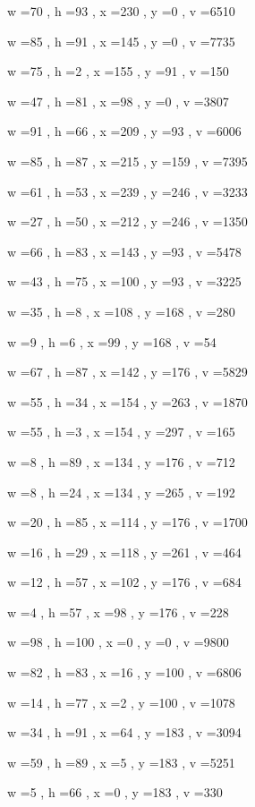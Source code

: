\documentclass[11pt]{article}
\begin{document}
w =70 , h =93 , x =230 , y =0 , v =6510
\par
w =85 , h =91 , x =145 , y =0 , v =7735
\par
w =75 , h =2 , x =155 , y =91 , v =150
\par
w =47 , h =81 , x =98 , y =0 , v =3807
\par
w =91 , h =66 , x =209 , y =93 , v =6006
\par
w =85 , h =87 , x =215 , y =159 , v =7395
\par
w =61 , h =53 , x =239 , y =246 , v =3233
\par
w =27 , h =50 , x =212 , y =246 , v =1350
\par
w =66 , h =83 , x =143 , y =93 , v =5478
\par
w =43 , h =75 , x =100 , y =93 , v =3225
\par
w =35 , h =8 , x =108 , y =168 , v =280
\par
w =9 , h =6 , x =99 , y =168 , v =54
\par
w =67 , h =87 , x =142 , y =176 , v =5829
\par
w =55 , h =34 , x =154 , y =263 , v =1870
\par
w =55 , h =3 , x =154 , y =297 , v =165
\par
w =8 , h =89 , x =134 , y =176 , v =712
\par
w =8 , h =24 , x =134 , y =265 , v =192
\par
w =20 , h =85 , x =114 , y =176 , v =1700
\par
w =16 , h =29 , x =118 , y =261 , v =464
\par
w =12 , h =57 , x =102 , y =176 , v =684
\par
w =4 , h =57 , x =98 , y =176 , v =228
\par
w =98 , h =100 , x =0 , y =0 , v =9800
\par
w =82 , h =83 , x =16 , y =100 , v =6806
\par
w =14 , h =77 , x =2 , y =100 , v =1078
\par
w =34 , h =91 , x =64 , y =183 , v =3094
\par
w =59 , h =89 , x =5 , y =183 , v =5251
\par
w =5 , h =66 , x =0 , y =183 , v =330
\par
\newpage
\end{document}
